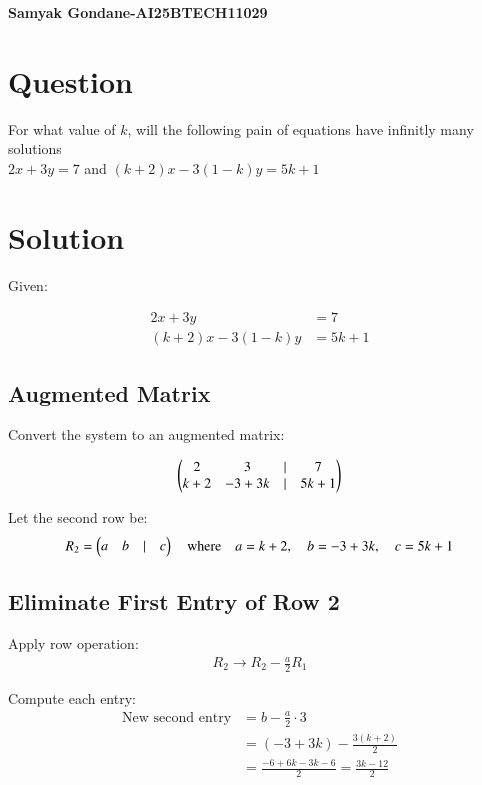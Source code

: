 \documentclass{article}
\begin{document}
\begin{center}
\large
    \textbf{Samyak Gondane-AI25BTECH11029}
\end{center}
\date{}

\section*{Question}
For what value of $k$, will the following pain of equations have infinitly many solutions\\

$2x + 3y = 7$ and $(k + 2)x - 3(1 - k)y = 5k + 1$

\section*{Solution}

Given:

\begin{align}
2x + 3y &= 7 \\
(k + 2)x - 3(1 - k)y &= 5k + 1
\end{align}


\subsection*{Augmented Matrix}
Convert the system to an augmented matrix:

\begin{align}
\begin{pmatrix}2 & 3 & \vert & 7 \\
k+2 & -3 + 3k & \vert & 5k + 1\end{pmatrix}
\end{align}

Let the second row be:
\begin{align}
R_2 = \begin{pmatrix}a & b & \vert & c\end{pmatrix}
\quad \text{where} \quad
a = k+2,\quad b = -3 + 3k,\quad c = 5k + 1
\end{align}


\subsection*{Eliminate First Entry of Row 2}

Apply row operation:
\begin{align}
R_2 \rightarrow R_2 - \frac{a}{2} R_1
\end{align}

Compute each entry:
\begin{align}
\text{New second entry} &= b - \frac{a}{2} \cdot 3 \\
&= (-3 + 3k) - \frac{3(k + 2)}{2} \\
&= \frac{-6 + 6k - 3k - 6}{2} = \frac{3k - 12}{2}
\end{align}
\end{document}
